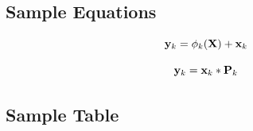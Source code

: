 \subsection{Sample Equations}

\begin{equation}
{\bf y}_k = \phi_k ( {\bf X}) + {\bf x}_k 
\label{eq:prn}
\end{equation}


\begin{equation}
{\bf y}_k = {\bf x}_k * {\bf P}_k
\end{equation}

\subsection{Sample Table}

\begin{table}[h]
\caption{Results}
\label{table:test}

\end{table}























